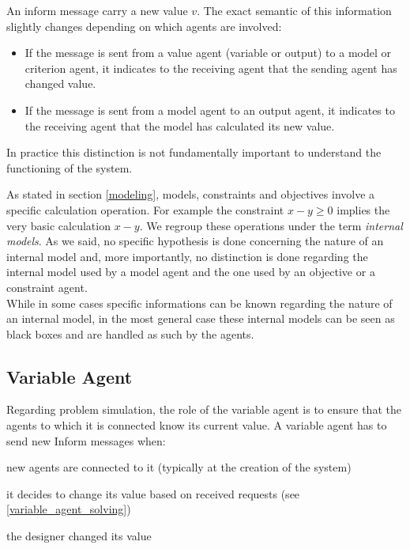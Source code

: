 An inform message carry a new value $v$. The exact semantic of this information slightly changes depending on which agents are involved:

\begin{itemize}
\item If the message is sent from a value agent (variable or output) to a model or criterion agent, it indicates to the receiving agent that the sending agent has changed value.

\item If the message is sent from a model agent to an output agent, it indicates to the receiving agent that the model has calculated its new value.
\end{itemize}

In practice this distinction is not fundamentally important to understand the functioning of the system.

As stated in section \ref{modeling}, models, constraints and objectives involve a specific calculation operation. For example the constraint $x -y \geq 0$ implies the very basic calculation $x - y$. We regroup these operations under the term \emph{internal models}. As we said, no specific hypothesis is done concerning the nature of an internal model and, more importantly, no distinction is done regarding the internal model used by a model agent and the one used by an objective or a constraint agent.\\
While in some cases specific informations can be known regarding the nature of an internal model, in the most general case these internal models can be seen as black boxes and are handled as such by the agents.

\subsection{Variable Agent}

Regarding problem simulation, the role of the variable agent is to ensure that the agents to which it is connected know its current value.
A variable agent has to send new Inform messages when:
\begin{compactitem}
\item new agents are connected to it (typically at the creation of the system)
\item it decides to change its value based on received requests (see \ref{variable_agent_solving})
\item the designer changed its value
\end{compactitem}

